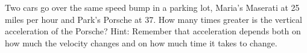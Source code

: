 Two cars go over the same speed bump in a parking lot, Maria's
Maserati at 25 miles per hour and Park's Porsche at 37. How
many times greater is the vertical acceleration of the
Porsche? Hint: Remember that acceleration depends both on
how much the velocity changes and on how much time it takes to change.\answercheck
